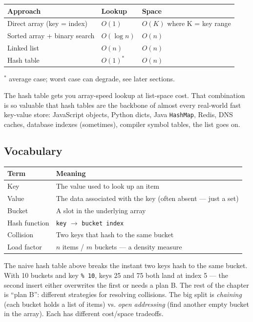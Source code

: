 \documentclass[11pt]{article}
\begin{document}
\begin{center}
\begin{tabular}{|l|l|l|}
\hline
\textbf{Approach} & \textbf{Lookup} & \textbf{Space} \\
\hline
Direct array (key = index)       & $O(1)$ & $O(K)$ where K = key range \\
Sorted array + binary search     & $O(\log n)$ & $O(n)$ \\
Linked list                      & $O(n)$ & $O(n)$ \\
Hash table                       & $O(1)^*$ & $O(n)$ \\
\hline
\end{tabular}
\end{center}

\noindent $^*$ average case; worst case can degrade, see later sections.

The hash table gets you array-speed lookup at list-space cost.
That combination is so valuable that hash tables are the backbone
of almost every real-world fast key-value store: JavaScript
objects, Python dicts, Java \texttt{HashMap}, Redis, DNS caches,
database indexes (sometimes), compiler symbol tables, the list
goes on.

\subsection*{Vocabulary}

\begin{center}
\begin{tabular}{|l|l|}
\hline
\textbf{Term} & \textbf{Meaning} \\
\hline
Key            & The value used to look up an item \\
Value          & The data associated with the key (often absent --- just a set) \\
Bucket         & A slot in the underlying array \\
Hash function  & \texttt{key} $\to$ \texttt{bucket index} \\
Collision      & Two keys that hash to the same bucket \\
Load factor    & $n$ items / $m$ buckets --- a density measure \\
\hline
\end{tabular}
\end{center}

\begin{ideabox}
The naive hash table above breaks the instant two keys hash to
the same bucket. With 10 buckets and key \texttt{\% 10}, keys 25
and 75 both land at index 5 --- the second insert either
overwrites the first or needs a plan B. The rest of the chapter
is ``plan B'': different strategies for resolving collisions. The
big split is \emph{chaining} (each bucket holds a list of items)
vs. \emph{open addressing} (find another empty bucket in the
array). Each has different cost/space tradeoffs.
\end{ideabox}
\end{document}
